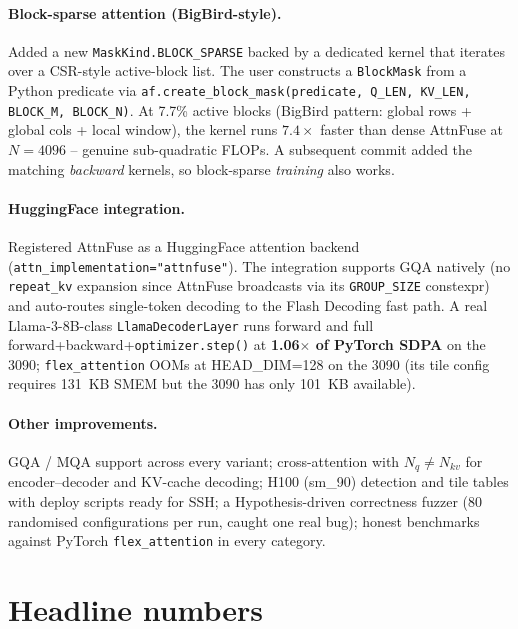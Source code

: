 \documentclass[11pt]{article}
\begin{document}
\paragraph{Block-sparse attention (BigBird-style).} Added a new
\texttt{MaskKind.BLOCK\_SPARSE} backed by a dedicated kernel that
iterates over a CSR-style active-block list. The user constructs a
\texttt{BlockMask} from a Python predicate via
\texttt{af.create\_block\_mask(predicate, Q\_LEN, KV\_LEN, BLOCK\_M, BLOCK\_N)}.
At 7.7\% active blocks (BigBird pattern: global rows + global cols +
local window), the kernel runs $7.4\times$ faster than dense AttnFuse
at $N=4096$ -- genuine sub-quadratic FLOPs. A subsequent commit added
the matching \emph{backward} kernels, so block-sparse \emph{training}
also works.

\paragraph{HuggingFace integration.} Registered AttnFuse as a
HuggingFace attention backend (\texttt{attn\_implementation="attnfuse"}).
The integration supports GQA natively (no \texttt{repeat\_kv} expansion
since AttnFuse broadcasts via its \texttt{GROUP\_SIZE} constexpr) and
auto-routes single-token decoding to the Flash Decoding fast path. A
real Llama-3-8B-class \texttt{LlamaDecoderLayer} runs forward and full
forward+backward+\texttt{optimizer.step()} at \textbf{1.06$\times$ of
PyTorch SDPA} on the 3090; \texttt{flex\_attention} OOMs at
HEAD\_DIM=128 on the 3090 (its tile config requires 131~KB SMEM but
the 3090 has only 101~KB available).

\paragraph{Other improvements.} GQA / MQA support across every variant;
cross-attention with $N_q \neq N_{kv}$ for encoder--decoder and
KV-cache decoding; H100 (sm\_90) detection and tile tables with
deploy scripts ready for SSH; a Hypothesis-driven correctness fuzzer
(80 randomised configurations per run, caught one real bug); honest
benchmarks against PyTorch \texttt{flex\_attention} in every category.

\section{Headline numbers}
\end{document}
